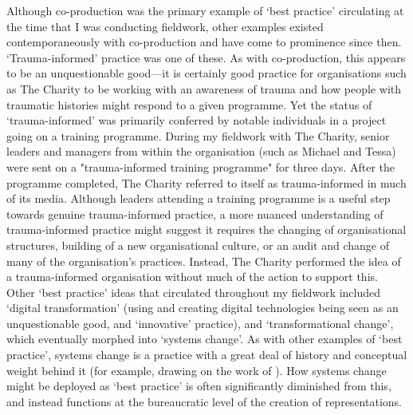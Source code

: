 Although co-production was the primary example of `best practice' circulating at the time that I was conducting fieldwork, other examples existed contemporaneously with co-production and have come to prominence since then. `Trauma-informed' practice was one of these. As with co-production, this appears to be an unquestionable good—it is certainly good practice for organisations such as The Charity to be working with an awareness of trauma and how people with traumatic histories might respond to a given programme. Yet the status of `trauma-informed' was primarily conferred by notable individuals in a project going on a training programme. During my fieldwork with The Charity, senior  leaders and managers from within the organisation (such as Michael and Tessa) were sent on a "trauma-informed training programme" for three days. After the programme completed, The Charity referred to itself as trauma-informed in much of its media. Although leaders attending a training programme is a useful step towards genuine trauma-informed practice, a more nuanced understanding of trauma-informed practice might suggest it requires the changing of organisational structures, building of a new organisational culture, or an audit and change of many of the organisation's practices.  Instead, The Charity performed the idea of a trauma-informed organisation without much of the action to support this. Other `best practice' ideas that circulated throughout my fieldwork included `digital transformation' (using and creating digital technologies being seen as an unquestionable good, and `innovative' practice), and `transformational change', which eventually morphed into `systems change'. As with other examples of `best practice', systems change is a practice with a great deal of history and conceptual weight behind it (for example, drawing on the work of \citet{donella_meadows_leverage_1997}). How systems change might be deployed as `best practice' is often significantly diminished from this, and instead functions at the bureaucratic level of the creation of representations. 

